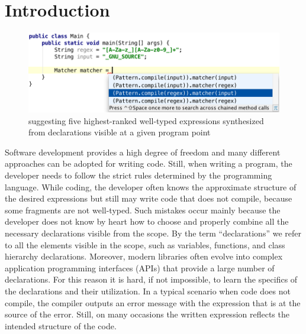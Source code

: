 \section{Introduction}
\label{sec:intro}

\begin{figure}[!tbh]
\includegraphics[natwidth=\textwidth]{RegexMatcher.png}
\caption{{\ourTool} suggesting five highest-ranked 
well-typed expressions synthesized from declarations visible at a given program point\label{fig:screenshot1}}
\end{figure}


Software development provides a high degree of freedom and
many different approaches can be adopted for writing
code. Still, when writing a program, the developer needs to follow
the strict rules determined by the programming language. While coding, the developer often knows the
approximate structure of the desired expressions but still may write code
that does not compile, because some fragments are not well-typed.
Such mistakes occur mainly because the developer does not
know by heart how to choose and properly combine all the necessary
declarations visible from the scope. By the term ``declarations'' 
we refer to all the elements visible in the scope, such as variables, functions, and class
hierarchy declarations. Moreover, modern libraries often evolve into complex 
application programming interfaces (APIs) that provide
a large number of declarations. For this reason 
it is hard, if not impossible, to learn the specifics of
the declarations and their utilization. In a typical scenario when code does not compile, the compiler outputs
an error message with the expression that is at the source of the
error. Still, on many occasions the written expression reflects the
intended structure of the code. 

